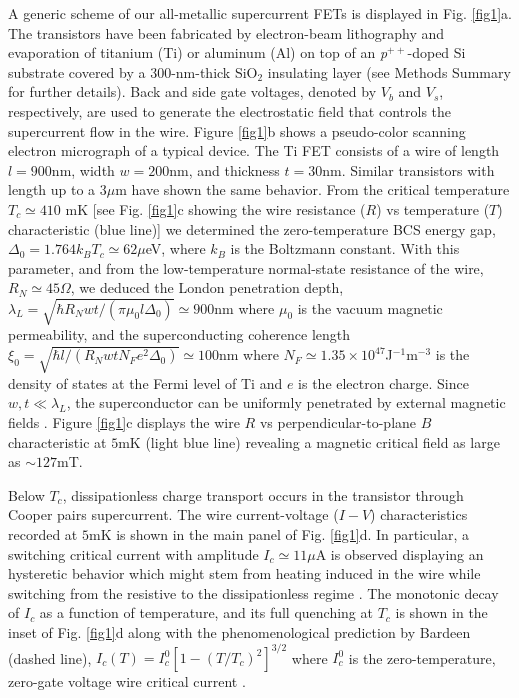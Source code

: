 \documentclass[prl,twocolumn,reprint,graphicx,showpacs,superscriptaddress,floatfix]{revtex4-1}
\begin{document}
A generic scheme of our all-metallic supercurrent FETs is displayed in Fig. \ref{fig1}a. The transistors have been fabricated by electron-beam lithography and evaporation of titanium (Ti) or aluminum (Al) on top of an \emph{p}$^{++}$-doped Si substrate covered by a 300-nm-thick SiO$_2$  insulating layer (see Methods Summary for further details). 
Back and side gate voltages, denoted  by $V_b$ and $V_s$, respectively, are used to generate the electrostatic field that
controls the supercurrent flow in the wire.
Figure \ref{fig1}b shows a pseudo-color scanning electron micrograph of a typical device. 
The Ti FET consists of a wire of length $l=900$nm, width $w=200$nm, and thickness $t=30$nm. Similar transistors with length up to a $3\mu$m have shown  the same behavior. 
From the critical temperature $T_c\simeq 410$ mK  [see Fig. \ref{fig1}c showing the wire resistance ($R$) vs temperature ($T$) characteristic (blue line)] we determined the zero-temperature BCS energy gap, $\Delta_0=1.764 k_B T_c\simeq 62 \mu$eV, where $k_B$ is the Boltzmann constant.  
With this parameter, and from the low-temperature normal-state resistance of the wire, $R_N\simeq 45\Omega$, we deduced the London penetration depth, $\lambda_L=\sqrt{\hbar R_N wt/(\pi \mu_0 l \Delta_0)}\simeq 900$nm where $\mu_0$ is the vacuum magnetic permeability, and the superconducting coherence length $\xi_0=\sqrt{\hbar l/(R_NwtN_Fe^2\Delta_0)}\simeq 100$nm where $N_F\simeq 1.35\times 10^{47}$J$^{-1}$m$^{-3}$ is the density of states at the Fermi level of Ti and $e$ is the electron charge.
Since $w,t\ll  \lambda_L$,
the superconductor can be uniformly penetrated by external magnetic fields \cite{Anthore2003}.   
Figure \ref{fig1}c displays the wire  $R$ vs perpendicular-to-plane $B$ characteristic  at $5$mK (light blue line) revealing a  magnetic critical field as large as $\sim 127$mT.

Below $T_c$, dissipationless charge transport occurs in the transistor through Cooper pairs supercurrent. 
The wire current-voltage ($I-V$) characteristics recorded at $5$mK is shown in the main panel of Fig. \ref{fig1}d. 
In particular, a switching critical current with amplitude $I_c\simeq 11\mu$A is observed displaying an hysteretic behavior which might stem from heating induced in the wire while switching from the resistive to the 
dissipationless regime \cite{Courtois2008}. 
The monotonic decay of $I_c$ as a function of temperature, and its full  quenching at $T_c$ is shown in the inset of  Fig. \ref{fig1}d along with the phenomenological prediction by Bardeen (dashed line), $I_c(T)=I_c^0[1-(T/T_c)^2]^{3/2}$ where $I_c^0$ is the zero-temperature, zero-gate voltage wire critical current \cite{Bardeen1962}.
\end{document}

